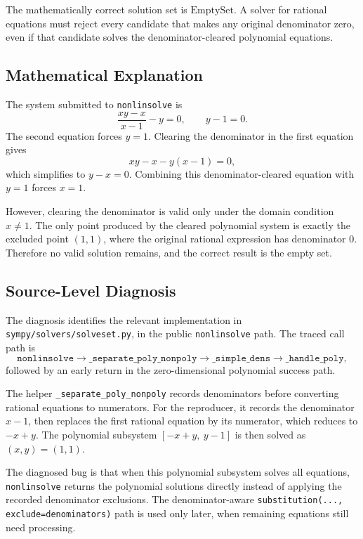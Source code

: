 \documentclass[11pt]{article}
\begin{document}
The mathematically correct solution set is \(\mathrm{EmptySet}\).  A solver for rational equations must reject every candidate that makes any original denominator zero, even if that candidate solves the denominator-cleared polynomial equations.

\subsection{Mathematical Explanation}

The system submitted to \texttt{nonlinsolve} is
\[
  \frac{xy-x}{x-1}-y = 0,
  \qquad
  y-1 = 0.
\]
The second equation forces \(y=1\).  Clearing the denominator in the first equation gives
\[
  xy-x-y(x-1)=0,
\]
which simplifies to \(y-x=0\).  Combining this denominator-cleared equation with \(y=1\) forces \(x=1\).

However, clearing the denominator is valid only under the domain condition \(x\ne 1\).  The only point produced by the cleared polynomial system is exactly the excluded point \((1,1)\), where the original rational expression has denominator \(0\).  Therefore no valid solution remains, and the correct result is the empty set.

\subsection{Source-Level Diagnosis}

The diagnosis identifies the relevant implementation in \nolinkurl{sympy/solvers/solveset.py}, in the public \texttt{nonlinsolve} path.  The traced call path is
\[
\texttt{nonlinsolve}
\to
\texttt{\_separate\_poly\_nonpoly}
\to
\texttt{\_simple\_dens}
\to
\texttt{\_handle\_poly},
\]
followed by an early return in the zero-dimensional polynomial success path.

The helper \texttt{\_separate\_poly\_nonpoly} records denominators before converting rational equations to numerators.  For the reproducer, it records the denominator \(x-1\), then replaces the first rational equation by its numerator, which reduces to \(-x+y\).  The polynomial subsystem \([-x+y,\ y-1]\) is then solved as \((x,y)=(1,1)\).

The diagnosed bug is that when this polynomial subsystem solves all equations, \texttt{nonlinsolve} returns the polynomial solutions directly instead of applying the recorded denominator exclusions.  The denominator-aware \texttt{substitution(..., exclude=denominators)} path is used only later, when remaining equations still need processing.
\end{document}
